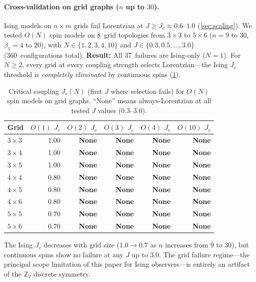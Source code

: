 \documentclass[11pt]{article}
\theoremstyle{definition}
\theoremstyle{remark}
\begin{document}
\paragraph{Cross-validation on grid graphs ($n$ up to $30$).}
Ising models on $n \times m$ grids fail Lorentzian at $J \geq J_c
\approx 0.6$--$1.0$ (\cref{sec:scaling}). We tested $O(N)$ spin models
on 8~grid topologies from $3 \times 3$ to $5 \times 6$ ($n = 9$ to $30$,
$\beta_1 = 4$ to $20$), with $N \in \{1, 2, 3, 4, 10\}$ and
$J \in \{0.3, 0.5, \ldots, 3.0\}$ (360~configurations total).
\textbf{Result:} All 37~failures are Ising-only ($N = 1$).
For $N \geq 2$, every grid at every coupling strength selects
Lorentzian---the Ising $J_c$ threshold is \emph{completely
eliminated} by continuous spins (\cref{tab:grid-on}).

\begin{table}[htbp]
\centering
\caption{Critical coupling $J_c(N)$ (first $J$ where selection fails)
for $O(N)$ spin models on grid graphs. ``None'' means always-Lorentzian
at all tested $J$ values ($0.3$--$3.0$).}
\label{tab:grid-on}
\begin{tabular}{@{}lrrrrr@{}}
\toprule
Grid & $O(1)$ $J_c$ & $O(2)$ $J_c$ & $O(3)$ $J_c$ & $O(4)$ $J_c$ & $O(10)$ $J_c$ \\
\midrule
$3 \times 3$ & 1.00 & \textbf{None} & \textbf{None} & \textbf{None} & \textbf{None} \\
$3 \times 4$ & 1.00 & \textbf{None} & \textbf{None} & \textbf{None} & \textbf{None} \\
$3 \times 5$ & 1.00 & \textbf{None} & \textbf{None} & \textbf{None} & \textbf{None} \\
$4 \times 4$ & 0.80 & \textbf{None} & \textbf{None} & \textbf{None} & \textbf{None} \\
$4 \times 5$ & 0.80 & \textbf{None} & \textbf{None} & \textbf{None} & \textbf{None} \\
$4 \times 6$ & 0.80 & \textbf{None} & \textbf{None} & \textbf{None} & \textbf{None} \\
$5 \times 5$ & 0.70 & \textbf{None} & \textbf{None} & \textbf{None} & \textbf{None} \\
$5 \times 6$ & 0.70 & \textbf{None} & \textbf{None} & \textbf{None} & \textbf{None} \\
\bottomrule
\end{tabular}
\end{table}

\noindent The Ising $J_c$ decreases with grid size ($1.0 \to 0.7$
as $n$ increases from $9$ to $30$), but continuous spins show no
failure at any $J$ up to $3.0$. The grid failure regime---the
principal scope limitation of this paper for Ising observers---is
entirely an artifact of the $\mathbb{Z}_2$ discrete symmetry.
\end{document}
